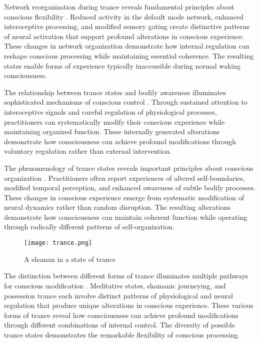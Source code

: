 \begin{refsection}
Network reorganization during trance reveals fundamental principles about conscious flexibility \cite{Wier2009}. Reduced activity in the default mode network, enhanced interoceptive processing, and modified sensory gating create distinctive patterns of neural activation that support profound alterations in conscious experience. These changes in network organization demonstrate how internal regulation can reshape conscious processing while maintaining essential coherence. The resulting states enable forms of experience typically inaccessible during normal waking consciousness.

The relationship between trance states and bodily awareness illuminates sophisticated mechanisms of conscious control \cite{Goodman1988}. Through sustained attention to interoceptive signals and careful regulation of physiological processes, practitioners can systematically modify their conscious experience while maintaining organized function. These internally generated alterations demonstrate how consciousness can achieve profound modifications through voluntary regulation rather than external intervention.

The phenomenology of trance states reveals important principles about conscious organization \cite{Lapassade1990}. Practitioners often report experiences of altered self-boundaries, modified temporal perception, and enhanced awareness of subtle bodily processes. These changes in conscious experience emerge from systematic modification of neural dynamics rather than random disruption. The resulting alterations demonstrate how consciousness can maintain coherent function while operating through radically different patterns of self-organization.

\begin{figure}[h]
    \centering
    \texttt{[image: trance.png]}

    \caption{A shaman in a state of trance}
\end{figure}

The distinction between different forms of trance illuminates multiple pathways for conscious modification \cite{Bourguignon1973}. Meditative states, shamanic journeying, and possession trance each involve distinct patterns of physiological and neural regulation that produce unique alterations in conscious experience. These various forms of trance reveal how consciousness can achieve profound modifications through different combinations of internal control. The diversity of possible trance states demonstrates the remarkable flexibility of conscious processing.


\end{refsection}
